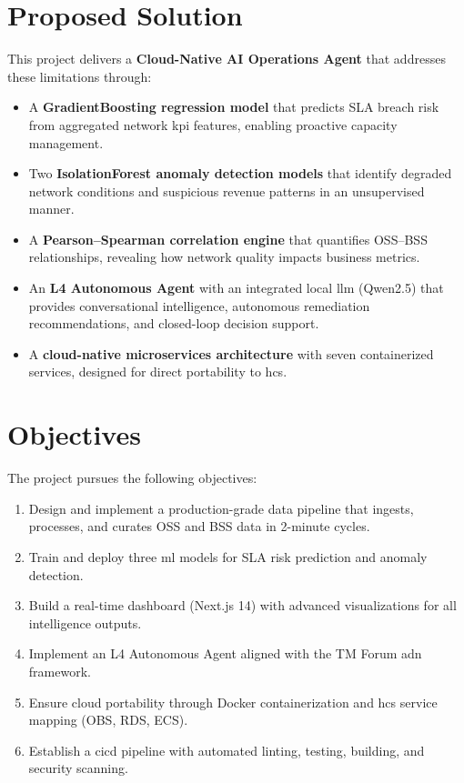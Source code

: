 \section{Proposed Solution}

This project delivers a \textbf{Cloud-Native AI Operations Agent} that addresses these limitations through:

\begin{itemize}
    \item A \textbf{GradientBoosting regression model} that predicts SLA breach risk from aggregated network \gls{kpi} features, enabling proactive capacity management.
    \item Two \textbf{IsolationForest anomaly detection models} that identify degraded network conditions and suspicious revenue patterns in an unsupervised manner.
    \item A \textbf{Pearson--Spearman correlation engine} that quantifies OSS--BSS relationships, revealing how network quality impacts business metrics.
    \item An \textbf{L4 Autonomous Agent} with an integrated local \gls{llm} (Qwen2.5) that provides conversational intelligence, autonomous remediation recommendations, and closed-loop decision support.
    \item A \textbf{cloud-native microservices architecture} with seven containerized services, designed for direct portability to \gls{hcs}.
\end{itemize}

\section{Objectives}

The project pursues the following objectives:

\begin{enumerate}
    \item Design and implement a production-grade data pipeline that ingests, processes, and curates OSS and BSS data in 2-minute cycles.
    \item Train and deploy three \gls{ml} models for SLA risk prediction and anomaly detection.
    \item Build a real-time dashboard (Next.js 14) with advanced visualizations for all intelligence outputs.
    \item Implement an L4 Autonomous Agent aligned with the TM Forum \gls{adn} framework.
    \item Ensure cloud portability through Docker containerization and \gls{hcs} service mapping (OBS, RDS, ECS).
    \item Establish a \gls{cicd} pipeline with automated linting, testing, building, and security scanning.
\end{enumerate}

